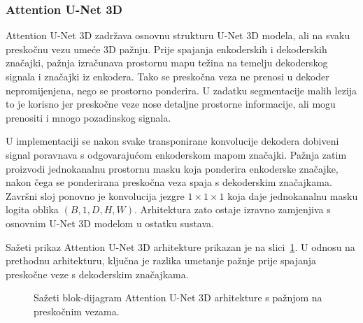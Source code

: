 \documentclass[a4paper,12pt,oneside]{article}
\begin{document}
\subsubsection{Attention U-Net 3D}

Attention U-Net 3D zadržava osnovnu strukturu U-Net 3D modela, ali na svaku preskočnu vezu umeće 3D pažnju. Prije spajanja enkoderskih i dekoderskih značajki, pažnja izračunava prostornu mapu težina na temelju dekoderskog signala i značajki iz enkodera. Tako se preskočna veza ne prenosi u dekoder nepromijenjena, nego se prostorno ponderira. U zadatku segmentacije malih lezija to je korisno jer preskočne veze nose detaljne prostorne informacije, ali mogu prenositi i mnogo pozadinskog signala.

U implementaciji se nakon svake transponirane konvolucije dekodera dobiveni signal poravnava s odgovarajućom enkoderskom mapom značajki. Pažnja zatim proizvodi jednokanalnu prostornu masku koja ponderira enkoderske značajke, nakon čega se ponderirana preskočna veza spaja s dekoderskim značajkama. Završni sloj ponovno je konvolucija jezgre $1 \times 1 \times 1$ koja daje jednokanalnu masku logita oblika $(B, 1, D, H, W)$. Arhitektura zato ostaje izravno zamjenjiva s osnovnim U-Net 3D modelom u ostatku sustava.

Sažeti prikaz Attention U-Net 3D arhitekture prikazan je na slici~\ref{fig:attention_unet3d_arch}. U odnosu na prethodnu arhitekturu, ključna je razlika umetanje pažnje prije spajanja preskočne veze s dekoderskim značajkama.

\begin{figure}[H]
\centering
{}
\caption{Sažeti blok-dijagram Attention U-Net 3D arhitekture s pažnjom na preskočnim vezama. \label{fig:attention_unet3d_arch}}
\end{figure}
\end{document}
